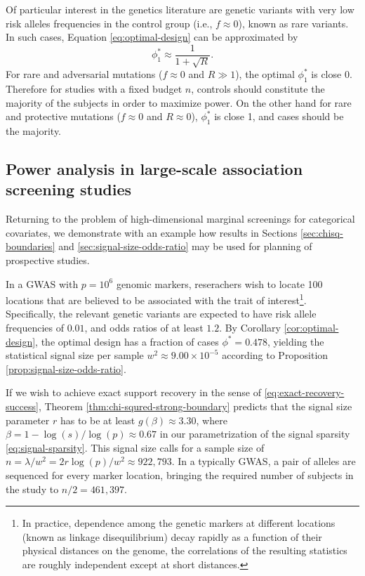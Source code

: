 Of particular interest in the genetics literature are genetic variants with very low risk alleles frequencies in the control group (i.e., $f\approx 0$), known as rare variants.
In such cases, Equation \eqref{eq:optimal-design} can be approximated by
\begin{equation} \label{eq:optimal-design-approx}
    \phi_1^* \approx \frac{1}{1 + \sqrt{R}}.
\end{equation}
For rare and adversarial mutations ($f\approx0$ and $R\gg1$), the optimal $\phi_1^*$ is close 0. 
Therefore for studies with a fixed budget $n$, controls should constitute the majority of the subjects in order to maximize power.
On the other hand for rare and protective mutations ($f\approx0$ and $R\approx0$), $\phi_1^*$ is close 1, and cases should be the majority.

\subsection{Power analysis in large-scale association screening studies}

Returning to the problem of high-dimensional marginal screenings for categorical covariates, we demonstrate with an example how results in Sections \ref{sec:chisq-boundaries} and \ref{sec:signal-size-odds-ratio} may be used for planning of prospective studies.

\begin{example}
In a GWAS with $p = 10^6$ genomic markers, reserachers wish to locate 100 locations that are believed to be associated with the trait of interest\footnote{In practice, dependence among the genetic markers at different locations (known as linkage disequilibrium) decay rapidly as a function of their physical distances on the genome, the correlations of the resulting statistics are roughly independent except at short distances.}.
Specifically, the relevant genetic variants are expected to have risk allele frequencies of $0.01$, and odds ratios of at least $1.2$.
By Corollary \ref{cor:optimal-design}, the optimal design has a fraction of cases $\phi^* = 0.478$, yielding the statistical signal size per sample $w^2\approx9.00\times10^{-5}$ according to Proposition \ref{prop:signal-size-odds-ratio}.

If we wish to achieve exact support recovery in the sense of \eqref{eq:exact-recovery-success}, Theorem \ref{thm:chi-squred-strong-boundary} predicts that the signal size parameter $r$ has to be at least $g(\beta) \approx 3.30$, where $\beta = 1 - \log(s)/\log(p) \approx 0.67$ in our parametrization of the signal sparsity \eqref{eq:signal-sparsity}.
This signal size calls for a sample size of $n = \lambda / w^2 = 2r\log(p)/w^2 \approx 922,793$.
In a typically GWAS, a pair of alleles are sequenced for every marker location, bringing the required number of subjects in the study to $n / 2 = 461,397$.
\end{example}

